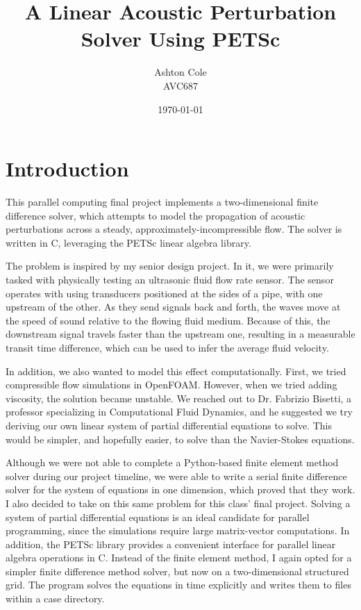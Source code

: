 \documentclass{article}
\title{A Linear Acoustic Perturbation Solver Using PETSc}
\author{Ashton Cole\\AVC687}
\date{\today}
\begin{document}
\maketitle

\section{Introduction}

This parallel computing final project implements a two-dimensional finite difference solver, which attempts to model the propagation of acoustic perturbations across a steady, approximately-incompressible flow. The solver is written in C, leveraging the PETSc linear algebra library.

The problem is inspired by my senior design project. In it, we were primarily tasked with physically testing an ultrasonic fluid flow rate sensor. The sensor operates with using transducers positioned at the sides of a pipe, with one upstream of the other. As they send signals back and forth, the waves move at the speed of sound relative to the flowing fluid medium. Because of this, the downstream signal travels faster than the upstream one, resulting in a measurable transit time difference, which can be used to infer the average fluid velocity.

In addition, we also wanted to model this effect computationally. First, we tried compressible flow simulations in OpenFOAM. However, when we tried adding viscosity, the solution became unstable. We reached out to Dr. Fabrizio Bisetti, a professor specializing in Computational Fluid Dynamics, and he suggested we try deriving our own linear system of partial differential equations to solve. This would be simpler, and hopefully easier, to solve than the Navier-Stokes equations.

Although we were not able to complete a Python-based finite element method solver during our project timeline, we were able to write a serial finite difference solver for the system of equations in one dimension, which proved that they work. I also decided to take on this same problem for this class' final project. Solving a system of partial differential equations is an ideal candidate for parallel programming, since the simulations require large matrix-vector computations. In addition, the PETSc library provides a convenient interface for parallel linear algebra operations in C. Instead of the finite element method, I again opted for a simpler finite difference method solver, but now on a two-dimensional structured grid. The program solves the equations in time explicitly and writes them to files within a case directory.
\end{document}
